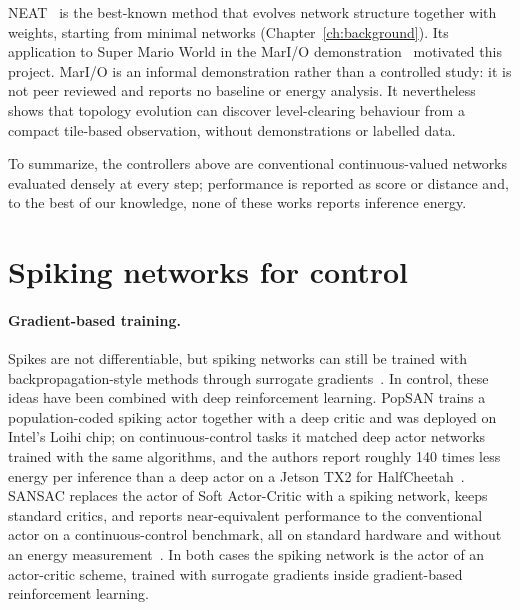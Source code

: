 NEAT~\cite{stanley2002} is the best-known method that evolves network structure together with weights, starting from minimal networks (Chapter~\ref{ch:background}).
Its application to Super Mario World in the MarI/O demonstration~\cite{sethbling2015mario} motivated this project.
MarI/O is an informal demonstration rather than a controlled study: it is not peer reviewed and reports no baseline or energy analysis.
It nevertheless shows that topology evolution can discover level-clearing behaviour from a compact tile-based observation, without demonstrations or labelled data.

To summarize, the controllers above are conventional continuous-valued networks evaluated densely at every step; performance is reported as score or distance and, to the best of our knowledge, none of these works reports inference energy.

\section{Spiking networks for control}
\label{sec:sota-snn-control}

\paragraph{Gradient-based training.}
Spikes are not differentiable, but spiking networks can still be trained with backpropagation-style methods through surrogate gradients~\cite{neftci2019surrogate}.
In control, these ideas have been combined with deep reinforcement learning.
PopSAN trains a population-coded spiking actor together with a deep critic and was deployed on Intel's Loihi chip; on continuous-control tasks it matched deep actor networks trained with the same algorithms, and the authors report roughly 140 times less energy per inference than a deep actor on a Jetson TX2 for HalfCheetah~\cite{tang2021popsan}.
SANSAC replaces the actor of Soft Actor-Critic with a spiking network, keeps standard critics, and reports near-equivalent performance to the conventional actor on a continuous-control benchmark, all on standard hardware and without an energy measurement~\cite{tang2026spiking}.
In both cases the spiking network is the actor of an actor-critic scheme, trained with surrogate gradients inside gradient-based reinforcement learning.

